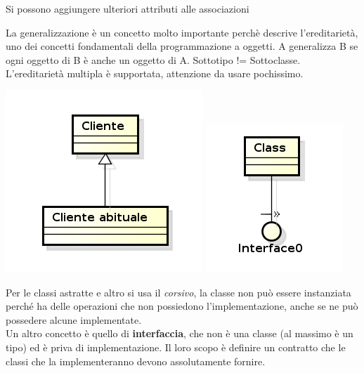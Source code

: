 Si possono aggiungere ulteriori attributi alle associazioni

La generalizzazione è un concetto molto importante perchè descrive l'ereditarietà, uno dei concetti fondamentali della programmazione a oggetti. A generalizza B se ogni oggetto di B è anche un oggetto di A. Sottotipo != Sottoclasse. L'ereditarietà multipla è supportata, attenzione da usare pochissimo.

\includegraphics[width=0.3\columnwidth]{img15} 
\includegraphics[width=0.3\columnwidth]{img16} %

Per le classi astratte e altro si usa il \textit{corsivo}, la classe non può essere instanziata perché ha delle operazioni che non possiedono l'implementazione, anche se ne può possedere alcune implementate.\\

Un altro concetto è quello di \textbf{interfaccia}, che non è una classe (al massimo è un tipo) ed è priva di implementazione. Il loro scopo è definire un contratto che le classi che la implementeranno devono assolutamente fornire.


